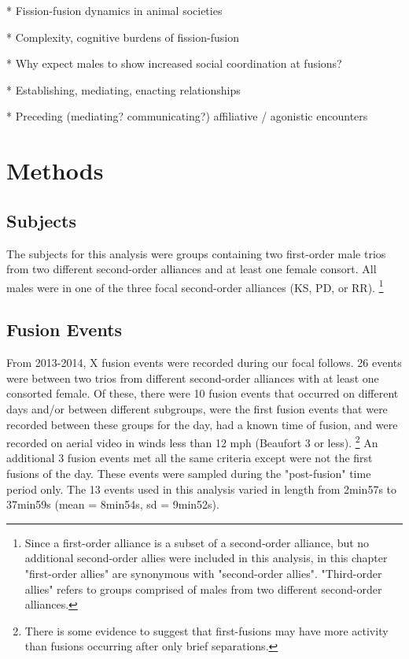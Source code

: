 \documentclass[11pt]{amsart}
\begin{document}
* Fission-fusion dynamics in animal societies \citep{aureli:2008, connor:2007,smolker:1992}

* Complexity, cognitive burdens of fission-fusion \citep{connor:2007, connor:2010}

* Why expect males to show increased social coordination at fusions?

* Establishing, mediating, enacting relationships

* Preceding (mediating? communicating?) affiliative / agonistic encounters

\section{Methods}
\subsection{Subjects}
The subjects for this analysis were groups containing two first-order male trios from two different second-order alliances and at least one female consort. All males were in one of the three focal second-order alliances (KS, PD, or RR). 
\footnote{Since a first-order alliance is a subset of a second-order alliance, but no additional second-order allies were included in this analysis, in this chapter "first-order allies" are synonymous with "second-order allies". "Third-order allies" refers to groups comprised of males from two different second-order alliances.} %

\subsection{Fusion Events}
From 2013-2014, X fusion events were recorded during our focal follows. %
26 events %
were between two trios from different second-order alliances with at least one consorted female. Of these, there were 10 fusion events that occurred on different days and/or between different subgroups, were the first fusion events that were recorded between these groups for the day, had a known time of fusion, and were recorded on aerial video in winds less than 12 mph (Beaufort 3 or less). 
\footnote{There is some evidence to suggest that first-fusions may have more activity than fusions occurring after only brief separations.}
An additional 3 fusion events met all the same criteria except were not the first fusions of the day. These events were sampled during the "post-fusion" time period only. The 13 events used in this analysis varied in length from 2min57s to 37min59s (mean = 8min54s, sd = 9min52s).
\end{document}
